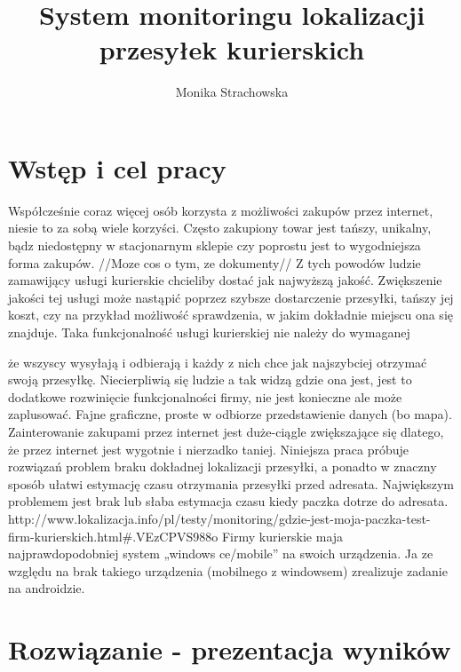 \documentclass[eng,printmode,oneside]{mgr}
\title{System monitoringu lokalizacji przesyłek kurierskich}
\author{Monika Strachowska}
\begin{document}

\maketitle %


\tableofcontents %

\chapter{Wstęp i cel pracy}
Współcześnie coraz więcej osób korzysta z możliwości zakupów przez internet,
niesie to za sobą wiele korzyści. Często zakupiony towar jest tańszy, unikalny,
bądz niedostępny w stacjonarnym sklepie czy poprostu jest to wygodniejsza forma
zakupów. //Moze cos o tym, ze dokumenty// Z tych powodów ludzie zamawijący
usługi kurierskie chcieliby dostać jak najwyższą jakość. Zwiększenie jakości tej
usługi może nastąpić poprzez szybsze dostarczenie przesyłki, tańszy jej koszt,
czy na przykład możliwość sprawdzenia, w jakim dokładnie miejscu ona się
znajduje. Taka funkcjonalność usługi kurierskiej nie należy do wymaganej



 że wszyscy wysyłają i odbierają i każdy z nich chce jak najszybciej
otrzymać swoją przesyłkę. Niecierpliwią się ludzie a tak widzą gdzie ona jest, jest to dodatkowe rozwinięcie funkcjonalności firmy, 
nie jest konieczne ale może zaplusować. Fajne graficzne, proste w odbiorze przedstawienie danych (bo mapa).
Zainterowanie zakupami przez internet jest duże-ciągle zwiększające się dlatego, że przez internet jest wygotnie i nierzadko taniej. 
Niniejsza praca próbuje rozwiązań problem braku dokładnej lokalizacji przesyłki, a ponadto w znaczny sposób ułatwi estymację czasu otrzymania przesyłki 
przed adresata.  
Największym problemem jest brak lub słaba estymacja czasu kiedy paczka dotrze do adresata.
http://www.lokalizacja.info/pl/testy/monitoring/gdzie-jest-moja-paczka-test-firm-kurierskich.html#.VEzCPVS988o
Firmy kurierskie maja najprawdopodobniej system „windows ce/mobile” na swoich urządzenia. Ja ze względu na brak takiego urządzenia (mobilnego z windowsem) 
zrealizuje zadanie na androidzie.
\chapter{Rozwiązanie - prezentacja wyników}
\end{document}
